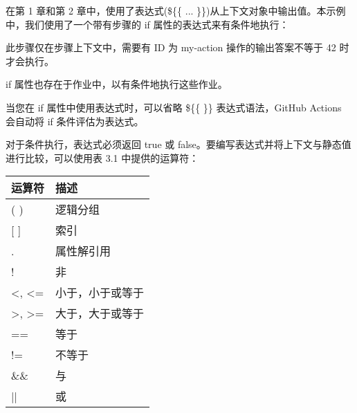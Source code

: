 在第 1 章和第 2 章中，使用了表达式(\$\{\{ ... \}\})从上下文对象中输出值。本示例中，我们使用了一个带有步骤的 if 属性的表达式来有条件地执行：


此步骤仅在步骤上下文中，需要有 ID 为 my-action 操作的输出答案不等于 42 时才会执行。

if 属性也存在于作业中，以有条件地执行这些作业。

当您在 if 属性中使用表达式时，可以省略 \$\{\{ \}\} 表达式语法，GitHub Actions 会自动将 if 条件评估为表达式。

对于条件执行，表达式必须返回 true 或 false。要编写表达式并将上下文与静态值进行比较，可以使用表 3.1 中提供的运算符：

\begin{longtable}[c]{|>{\centering\arraybackslash}p{3cm}|>{\centering\arraybackslash}p{12cm}|}
\hline
\textbf{运算符}              & \textbf{描述}                   \\ \hline
\endfirsthead
%
\endhead
%
( )                            & 逻辑分组                       \\ \hline
{[} {]}                        & 索引                                  \\ \hline
.                              & 属性解引用                  \\ \hline
!                              & 非                                    \\ \hline
\textless , \textless{}=       & 小于，小于或等于      \\ \hline
\textgreater , \textgreater{}= & 大于，大于或等于 \\ \hline
==                             & 等于                                  \\ \hline
!=                             & 不等于                              \\ \hline
\&\&                           & 与                                    \\ \hline
||                             & 或                                     \\ \hline
\end{longtable}

